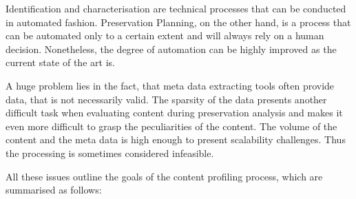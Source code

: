 Identification and characterisation are technical processes that can be conducted in automated fashion. Preservation Planning, on the other hand, is a process that can be automated only to a certain extent and will always rely on a human decision. Nonetheless, the degree of automation can be highly improved as the current state of the art is. 

A huge problem lies in the fact, that meta data extracting tools often provide data, that is not necessarily valid. The sparsity of the data presents another difficult task when evaluating content during preservation analysis and makes it even more difficult to grasp the peculiarities of the content. The volume of the content and the meta data is high enough to present scalability challenges. Thus the processing is sometimes considered infeasible.

All these issues outline the goals of the content profiling process, which are summarised as follows:

